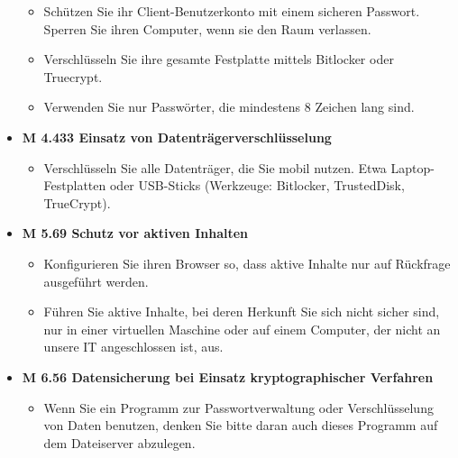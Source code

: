 \documentclass[]{article}
\begin{document}
\begin{itemize}
  \begin{itemize}
  \item
    Schützen Sie ihr Client-Benutzerkonto mit einem sicheren Passwort.
    Sperren Sie ihren Computer, wenn sie den Raum verlassen.
  \item
    Verschlüsseln Sie ihre gesamte Festplatte mittels Bitlocker oder
    Truecrypt.
  \item
    Verwenden Sie nur Passwörter, die mindestens 8 Zeichen lang sind.
  \end{itemize}
\item
  \textbf{M 4.433 Einsatz von Datenträgerverschlüsselung}

  \begin{itemize}
  \item
    Verschlüsseln Sie alle Datenträger, die Sie mobil nutzen. Etwa
    Laptop-Festplatten oder USB-Sticks (Werkzeuge: Bitlocker,
    TrustedDisk, TrueCrypt).
  \end{itemize}
\item
  \textbf{M 5.69 Schutz vor aktiven Inhalten}

  \begin{itemize}
  \item
    Konfigurieren Sie ihren Browser so, dass aktive Inhalte nur auf
    Rückfrage ausgeführt werden.
  \item
    Führen Sie aktive Inhalte, bei deren Herkunft Sie sich nicht sicher
    sind, nur in einer virtuellen Maschine oder auf einem Computer, der
    nicht an unsere IT angeschlossen ist, aus.
  \end{itemize}
\item
  \textbf{M 6.56 Datensicherung bei Einsatz kryptographischer Verfahren}

  \begin{itemize}
  \item
    Wenn Sie ein Programm zur Passwortverwaltung oder Verschlüsselung
    von Daten benutzen, denken Sie bitte daran auch dieses Programm auf
    dem Dateiserver abzulegen.
  \end{itemize}
\end{itemize}
\end{document}
